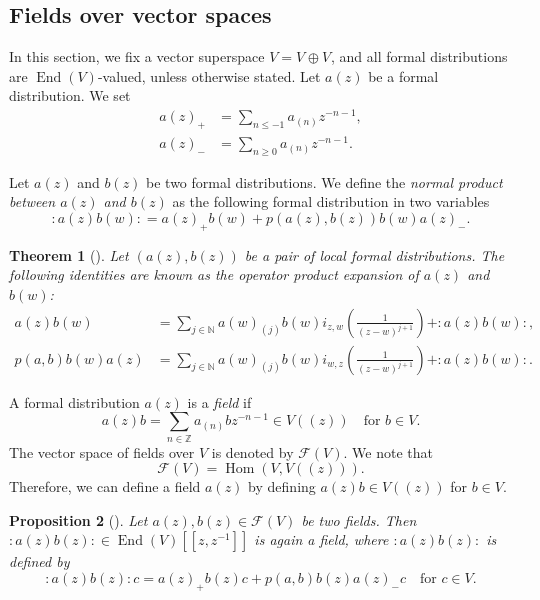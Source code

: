 \documentclass[a4paper, 12pt, reqno]{amsart}
\newtheorem{theorem}{Theorem}[section]
\newtheorem{proposition}[theorem]{Proposition}
\theoremstyle{remark}
\DeclareMathOperator{\End}{End}
\DeclareMathOperator{\zero}{\overline{0}}
\DeclareMathOperator{\one}{\overline{1}}
\DeclareMathOperator{\Hom}{Hom}
\begin{document}
\subsection{Fields over vector spaces}
\label{sec:fields-over-vector}

In this section, we fix a vector superspace $V = V_{\zero} \oplus V_{\one}$, and all formal distributions are $\End(V)$-valued, unless otherwise stated.
Let $a(z)$ be a formal distribution.
We set
\begin{align*}
  a(z)_+ &= \sum_{n \le -1}a_{(n)}z^{-n - 1}, \\
  a(z)_- &= \sum_{n \ge 0}a_{(n)}z^{-n - 1}.
\end{align*}

Let $a(z)$ and $b(z)$ be two formal distributions.
We define the \emph{normal product between $a(z)$ and $b(z)$} as the following formal distribution in two variables
\begin{equation*}
  :a(z)b(w): = a(z)_+b(w) + p(a(z), b(z))b(w)a(z)_-.
\end{equation*}

\begin{theorem}[{\cite[Proposition 3.2.3]{nozaradan_introduction_2008}}]
  \label{thr:11}
  Let $(a(z), b(z))$ be a pair of local formal distributions.
  The following identities are known as the operator product expansion of $a(z)$ and $b(w)$:
  \begin{align*}
    a(z)b(w) &= \sum_{j \in \mathbb{N}}a(w)_{(j)}b(w)i_{z, w}\left(\frac{1}{(z - w)^{j + 1}}\right) + :a(z)b(w):, \\
    p(a, b)b(w)a(z) &= \sum_{j \in \mathbb{N}}a(w)_{(j)}b(w)i_{w, z}\left(\frac{1}{(z - w)^{j + 1}}\right) + :a(z)b(w):.
  \end{align*}
\end{theorem}

A formal distribution $a(z)$ is a \emph{field} if
\begin{equation*}
  a(z)b = \sum_{n \in \mathbb{Z}}a_{(n)}bz^{-n - 1} \in V((z)) \quad \text{for $b \in V$}.
\end{equation*}
The vector space of fields over $V$ is denoted by $\mathcal{F}(V)$.
We note that
\begin{equation*}
  \mathcal{F}(V) = \Hom(V, V((z))).
\end{equation*}
Therefore, we can define a field $a(z)$ by defining $a(z)b \in V((z))$ for $b \in V$.

\begin{proposition}[{\cite[Proposition 3.3.2]{nozaradan_introduction_2008}}]
  \label{prp:6}
  Let $a(z), b(z) \in \mathcal{F}(V)$ be two fields.
  Then $:a(z)b(z): \in \End(V)[[z,z^{-1}]]$ is again a field, where $:a(z)b(z):$ is defined by
  \begin{equation*}
    :a(z)b(z):c = a(z)_+b(z)c + p(a, b)b(z)a(z)_-c \quad \text{for $c \in V$}.
  \end{equation*}
\end{proposition}
\end{document}
